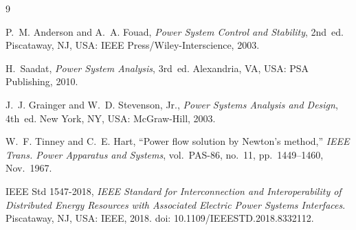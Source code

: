 \documentclass[12pt, a4paper]{article}
\begin{document}
\newpage
\begin{thebibliography}{9}

P.~M. Anderson and A.~A. Fouad, \textit{Power System Control and Stability}, 2nd~ed. Piscataway, NJ, USA: IEEE Press/Wiley-Interscience, 2003.

H.~Saadat, \textit{Power System Analysis}, 3rd~ed. Alexandria, VA, USA: PSA Publishing, 2010.

J.~J. Grainger and W.~D. Stevenson, Jr., \textit{Power Systems Analysis and Design}, 4th~ed. New York, NY, USA: McGraw-Hill, 2003.

W.~F. Tinney and C.~E. Hart, ``Power flow solution by Newton's method,'' \textit{IEEE Trans. Power Apparatus and Systems}, vol.~PAS-86, no.~11, pp.~1449--1460, Nov.~1967.

IEEE Std 1547-2018, \textit{IEEE Standard for Interconnection and Interoperability of Distributed Energy Resources with Associated Electric Power Systems Interfaces}. Piscataway, NJ, USA: IEEE, 2018. doi: 10.1109/IEEESTD.2018.8332112.

\end{thebibliography}
\end{document}
